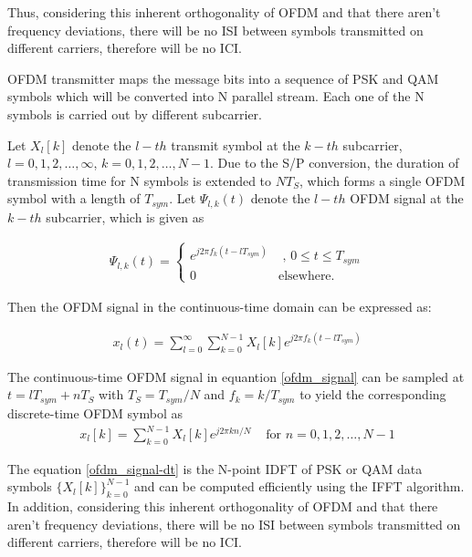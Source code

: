 \par Thus, considering this inherent orthogonality of OFDM and that there aren't frequency deviations, there will be no ISI between symbols transmitted on different carriers, therefore will be no ICI.

\par OFDM transmitter maps the message bits into a sequence of PSK and QAM symbols which will be converted into N parallel stream. Each one of the N symbols is carried out by different subcarrier. 

\par Let $X_l[k]$ denote the $l-th$ transmit symbol at the $k-th$ subcarrier, $l = 0,1,2,\ldots, \infty$, $k = 0, 1, 2, \ldots, N -1$. Due to the S/P conversion, the duration of transmission time for N symbols is extended to $NT_S$, which forms a single OFDM symbol with a length of $T_{sym}$. Let $\Psi_{l,k}(t)$ denote the $l-th$ OFDM signal at the $k-th$ subcarrier, which is given as

\begin{equation} \label{ofdm_signal}
\begin{split}
 \Psi_{l,k}(t) = \left\{
	\begin{array}{ll}
		e^{j2\pi f_k(t - lT_{sym})}  & \mbox{ , } 0 \le t \leq T_{sym} \\
		0  & \mbox{elsewhere. } 
	\end{array}
    \right.
\end{split}
\end{equation}
    

\par Then the OFDM signal in the continuous-time domain can be expressed as:

\begin{equation} \label{ofdm_signal-ct}
\begin{split}
 x_l(t) =  \sum_{l=0}^{\infty} \sum_{k=0}^{N-1}X_l[k]e^{j2\pi f_k(t - lT_{sym})}
\end{split}
\end{equation}

\par The continuous-time OFDM signal in equantion \ref{ofdm_signal} can be sampled at $t = lT_{sym} + nT_S$ with $T_S = T_{sym} / N$ and $f_k = k / T_{sym}$ to yield the corresponding discrete-time OFDM symbol as
\begin{equation} \label{ofdm_signal-dt}
\begin{split}
 x_l[k] =  \sum_{k=0}^{N-1}X_l[k]e^{j2\pi k n/N} & \mbox{ for } n = 0, 1, 2, \ldots, N -1
\end{split}
\end{equation}

\par The equation \ref{ofdm_signal-dt} is the N-point IDFT of PSK or QAM data symbols $\{X_l[k]\}_{k=0}^{N-1}$ and can be computed efficiently using the IFFT algorithm. In addition, considering this inherent orthogonality of OFDM and that there aren't frequency deviations, there will be no ISI between symbols transmitted on different carriers, therefore will be no ICI.